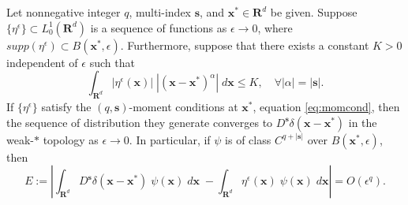 \begin{theorem}\label{thm:weakconv}
	Let nonnegative integer $q$, multi-index $\mathbf s$, and $\mathbf x^*\in\mathbf R^d$ be given.
	Suppose $\{\eta^\epsilon\}\subset L^1_{0}(\mathbf R^d)$ is a sequence of functions as $\epsilon\to 0$, where $supp(\eta^\epsilon)\subset B(\mathbf x^*,\epsilon)$.
	Furthermore, suppose that there exists a constant $K>0$ independent of $\epsilon$ such that 
	\begin{equation}\label{eq:boundH}
		\int_{\mathbf R^d} |\eta^\epsilon(\mathbf x)|\; |(\mathbf x-\mathbf x^*)^{\alpha}| \; d\mathbf x \le K, \quad \forall |\alpha| = |\mathbf s|.
	\end{equation}
	If $\{\eta^\epsilon\}$ satisfy the $(q,\mathbf s)$-moment conditions at $\mathbf x^*$, equation \ref{eq:momcond}, then the sequence of distribution they generate converges to $D^{\mathbf s}\delta(\mathbf x-\mathbf x^*)$ in the weak-$*$ topology as $\epsilon\to 0$.
	In particular, if $\psi$ is of class $C^{q+|\mathbf s|}$ over $B(\mathbf x^*,\epsilon)$, then
	\begin{equation}\label{eq:delta_error}
		E:= \left| \int_{\mathbf R^d} D^{\mathbf s}\delta(\mathbf x-\mathbf x^*)\;\psi(\mathbf x) \; d\mathbf x\; - 
		\int_{\mathbf R^d} \eta^\epsilon(\mathbf x) \; \psi(\mathbf x)\; d\mathbf x \right| = O(\epsilon^q).
	\end{equation}
\end{theorem}

